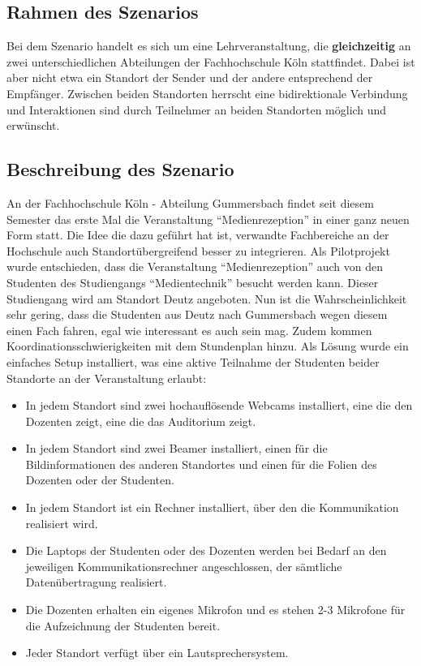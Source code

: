 \subsection{Rahmen des Szenarios} %
\label{ssec:rahmen_des_szenarios}

  Bei dem Szenario handelt es sich um eine Lehrveranstaltung, die \textbf{gleichzeitig} an zwei unterschiedlichen Abteilungen der Fachhochschule Köln stattfindet. Dabei ist aber nicht etwa ein Standort der Sender und der andere entsprechend der Empfänger. Zwischen beiden Standorten herrscht eine bidirektionale Verbindung und Interaktionen sind durch Teilnehmer an beiden Standorten möglich und erwünscht.


\subsection{Beschreibung des Szenario} %
\label{sub:beschreibung_des_szenario}

  An der Fachhochschule Köln - Abteilung Gummersbach findet seit diesem Semester das erste Mal die Veranstaltung "`Medienrezeption"' in einer ganz neuen Form statt. Die Idee die dazu geführt hat ist, verwandte Fachbereiche an der Hochschule auch Standortübergreifend besser zu integrieren. Als Pilotprojekt wurde entschieden, dass die Veranstaltung "`Medienrezeption"' auch von den Studenten des Studiengangs "`Medientechnik"' besucht werden kann. Dieser Studiengang wird am Standort Deutz angeboten. Nun ist die Wahrscheinlichkeit sehr gering, dass die Studenten aus Deutz nach Gummersbach wegen diesem einen Fach fahren, egal wie interessant es auch sein mag. Zudem kommen Koordinationsschwierigkeiten mit dem Stundenplan hinzu. Als Lösung wurde ein einfaches Setup installiert, was eine aktive Teilnahme der Studenten beider Standorte an der Veranstaltung erlaubt:

\begin{itemize}

	\item In jedem Standort sind zwei hochauflösende Webcams installiert, eine die den Dozenten zeigt, eine die das Auditorium zeigt.
	\item In jedem Standort sind zwei Beamer installiert, einen für die Bildinformationen des anderen Standortes und einen für die Folien des Dozenten oder der Studenten.
	\item In jedem Standort ist ein Rechner installiert, über den die Kommunikation realisiert wird.
	\item Die Laptops der Studenten oder des Dozenten werden bei Bedarf an den jeweiligen Kommunikationsrechner angeschlossen, der sämtliche Datenübertragung realisiert.
	\item Die Dozenten erhalten ein eigenes Mikrofon und es stehen 2-3 Mikrofone für die Aufzeichnung der Studenten bereit.
	\item Jeder Standort verfügt über ein Lautsprechersystem.

\end{itemize}

